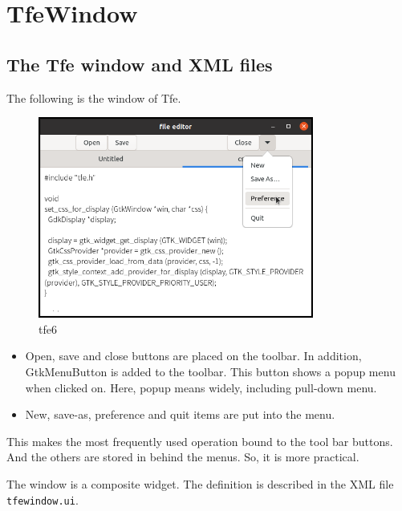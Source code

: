 \section{TfeWindow}\label{tfewindow}

\subsection{The Tfe window and XML
files}\label{the-tfe-window-and-xml-files}

The following is the window of Tfe.

\begin{figure}
\centering
\includegraphics[width=9.06cm,height=6.615cm]{../image/tfe6.png}
\caption{tfe6}
\end{figure}

\begin{itemize}
\tightlist
\item
  Open, save and close buttons are placed on the toolbar. In addition,
  GtkMenuButton is added to the toolbar. This button shows a popup menu
  when clicked on. Here, popup means widely, including pull-down menu.
\item
  New, save-as, preference and quit items are put into the menu.
\end{itemize}

This makes the most frequently used operation bound to the tool bar
buttons. And the others are stored in behind the menus. So, it is more
practical.

The window is a composite widget. The definition is described in the XML
file \passthrough{\lstinline!tfewindow.ui!}.

